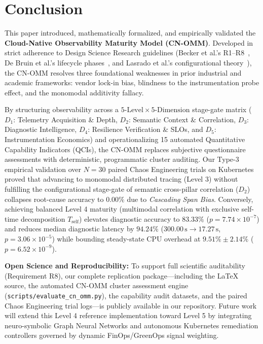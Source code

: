 \section{Conclusion}
\label{sec:conclusion}

This paper introduced, mathematically formalized, and empirically validated the \textbf{Cloud-Native Observability Maturity Model (CN-OMM)}. Developed in strict adherence to Design Science Research guidelines (Becker et al.'s R1--R8~\cite{becker_2009}, De Bruin et al.'s lifecycle phases~\cite{debruin_2005}, and Lasrado et al.'s configurational theory~\cite{lasrado_2015}), the CN-OMM resolves three foundational weaknesses in prior industrial and academic frameworks: vendor lock-in bias, blindness to the instrumentation probe effect, and the monomodal additivity fallacy.

By structuring observability across a $5\text{-Level} \times 5\text{-Dimension}$ stage-gate matrix ($D_1$: Telemetry Acquisition \& Depth, $D_2$: Semantic Context \& Correlation, $D_3$: Diagnostic Intelligence, $D_4$: Resilience Verification \& SLOs, and $D_5$: Instrumentation Economics) and operationalizing 15 automated Quantitative Capability Indicators (QCIs), the CN-OMM replaces subjective questionnaire assessments with deterministic, programmatic cluster auditing. Our Type-3 empirical validation over $N=30$ paired Chaos Engineering trials on Kubernetes proved that advancing to monomodal distributed tracing (Level 3) without fulfilling the configurational stage-gate of semantic cross-pillar correlation ($D_2$) collapses root-cause accuracy to $0.00\%$ due to \textit{Cascading Span Bias}. Conversely, achieving balanced Level 4 maturity (multimodal correlation with exclusive self-time decomposition $T_{\text{self}}$) elevates diagnostic accuracy to $83.33\%$ ($p = 7.74 \times 10^{-7}$) and reduces median diagnostic latency by $94.24\%$ ($300.00\,\text{s} \rightarrow 17.27\,\text{s}$, $p = 3.06 \times 10^{-5}$) while bounding steady-state CPU overhead at $9.51\% \pm 2.14\%$ ($p = 6.52 \times 10^{-9}$).

\textbf{Open Science and Reproducibility:} To support full scientific auditability (Requirement R8), our complete replication package---including the LaTeX source, the automated CN-OMM cluster assessment engine (\texttt{scripts/evaluate\_cn\_omm.py}), the capability audit datasets, and the paired Chaos Engineering trial logs---is publicly available in our repository. Future work will extend this Level 4 reference implementation toward Level 5 by integrating neuro-symbolic Graph Neural Networks and autonomous Kubernetes remediation controllers governed by dynamic FinOps/GreenOps signal weighting.
